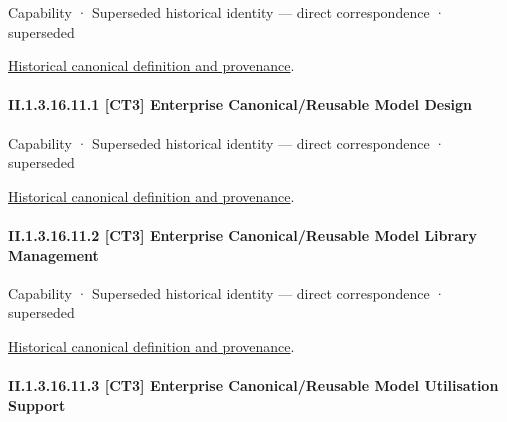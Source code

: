 \label{element:0bdd7f8c0cd74d9fabc49801af037fc2}
{\small Capability · Superseded historical identity — direct correspondence · superseded}\par
\href{../../../../continuum/strategy/capability/0bdd7f8c0cd74d9fabc49801af037fc2.md}{Historical canonical definition and provenance}.\par
\paragraph*{II.1.3.16.11.1 [CT3] Enterprise Canonical/Reusable Model Design}
\label{navigation:II.1.3.16.11.1}

\label{element:dbc37445ad944a85a7c4f26f410967b2}
{\small Capability · Superseded historical identity — direct correspondence · superseded}\par
\href{../../../../continuum/strategy/capability/dbc37445ad944a85a7c4f26f410967b2.md}{Historical canonical definition and provenance}.\par
\paragraph*{II.1.3.16.11.2 [CT3] Enterprise Canonical/Reusable Model Library Management}
\label{navigation:II.1.3.16.11.2}

\label{element:f5eccd4f65df49bba98104e5abfa5e19}
{\small Capability · Superseded historical identity — direct correspondence · superseded}\par
\href{../../../../continuum/strategy/capability/f5eccd4f65df49bba98104e5abfa5e19.md}{Historical canonical definition and provenance}.\par
\paragraph*{II.1.3.16.11.3 [CT3] Enterprise Canonical/Reusable Model Utilisation Support}
\label{navigation:II.1.3.16.11.3}

